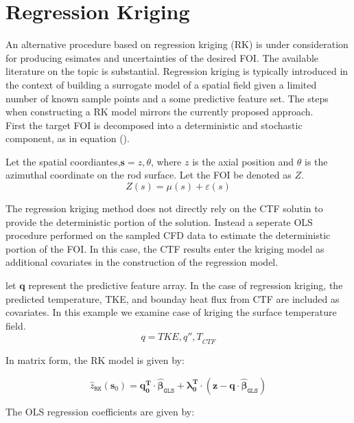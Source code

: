 \section{Regression Kriging}

An alternative procedure based on regression kriging (RK) is under consideration for producing esimates and uncertainties of the desired FOI.
The available literature on the topic is substantial.  Regression kriging is typically introduced in the context of building
a surrogate model of a spatial field given a limited number of known sample points and a some predictive feature set.
The steps when constructing a RK model mirrors the currently proposed approach. \\

First the target FOI is decomposed into a deterministic and stochastic component, as in equation ().

Let the spatial coordiantes,$\mathbf{s} = {z, \theta}$,
where $z$ is the axial position and $\theta$ is the azimuthal coordinate on the rod surface. Let the FOI be denoted as $Z$.
\begin{equation}
Z(s) = \mu(s) + \varepsilon(s)
\end{equation}

The regression kriging method does not directly rely on the
CTF solutin to provide the deterministic portion of the solution. Instead
a seperate OLS procedure performed on the sampled CFD data to estimate the deterministic portion of the FOI.
In this case, the CTF results enter the kriging model as additional covariates in the construction of the regression model.

let $\mathbf{q}$ represent the predictive feature array. In the case of regression kriging, the predicted temperature,
TKE, and bounday heat flux from CTF are included as covariates.
In this example we examine case of kriging the surface temperature field.
\begin{equation}
{q} = {TKE, q'', T}_{CTF}
\end{equation}

In matrix form, the RK model is given by:

\begin{equation}
\hat z_\mathtt{RK}(\mathbf{s}_0 ) = \mathbf{q}_\mathbf{0}^\mathbf{T} \cdot \mathbf{\hat \beta}_\mathtt{GLS} + \mathbf{\lambda }_\mathbf{0}^\mathbf{T} \cdot (\mathbf{z}
- \mathbf{q} \cdot \mathbf{\hat \beta }_\mathtt{GLS} )
\end{equation}

The OLS regression coefficients are given by:


